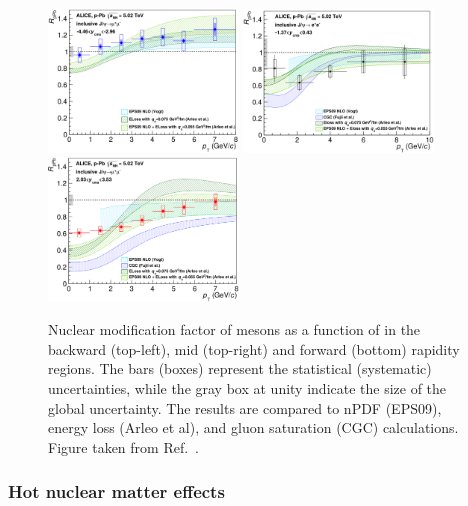 \begin{figure}[!htb]
 \centering
 \includegraphics[width=0.45\textwidth]{Figures/Charmonia/Theory/HeavyIons/EnergyLossALICE_1.png}
 \includegraphics[width=0.45\textwidth]{Figures/Charmonia/Theory/HeavyIons/EnergyLossALICE_2.png}
 \includegraphics[width=0.45\textwidth]{Figures/Charmonia/Theory/HeavyIons/EnergyLossALICE_3.png}
 \caption{Nuclear modification factor of \JPsi mesons as a function of \pt in the backward (top-left), mid (top-right) and forward (bottom) rapidity regions. The bars (boxes) represent the statistical (systematic) uncertainties, while the gray box at unity indicate the size of the global uncertainty. The results are compared to nPDF (EPS09), energy loss (Arleo et al), and gluon saturation (CGC) calculations. Figure taken from Ref.~\cite{ALICE_JPsi_RAA_pPb_5p02TeV}.}
 \label{fig:EnergyLossALICE}
\end{figure}

\subsubsection{Hot nuclear matter effects}\label{sec:Charmonia_Theory_HeavyIon_HotNuclearMatter}

